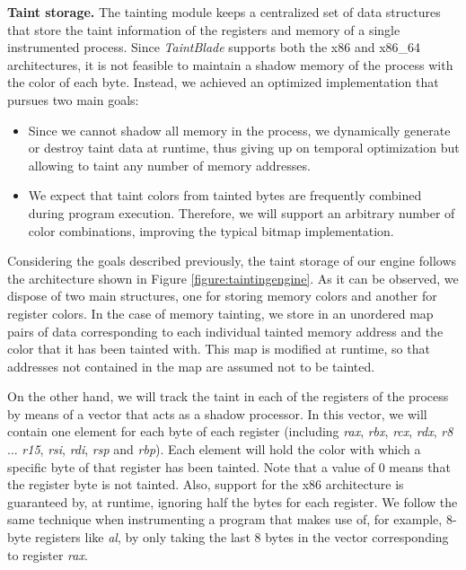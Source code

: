 \documentclass[conference]{IEEEtran}
\begin{document}
\textbf{Taint storage.} The tainting module keeps a centralized set
of data structures that store the taint information of the registers and memory of
a single instrumented process.
Since \textit{TaintBlade} supports both the x86 and x86\_64 architectures, it is not feasible to
maintain a shadow memory of the process with the color of each byte. Instead, we
achieved an optimized implementation that pursues two main goals:
\begin{itemize}
    \item Since we cannot shadow all memory in the process, we dynamically generate or
          destroy taint data at runtime, thus giving up on temporal optimization but
          allowing to taint any number of memory addresses.
    \item We expect that taint colors from tainted bytes are frequently combined during
          program execution. Therefore, we will support an arbitrary number of color
          combinations, improving the typical bitmap implementation.
\end{itemize}

Considering the goals described previously, the taint storage of our engine
follows the architecture shown in Figure \ref{figure:taintingengine}. As it can
be observed, we dispose of two main structures, one for storing memory colors
and another for register colors. In the case of memory tainting, we store in an
unordered map pairs of data corresponding to each individual tainted memory
address and the color that it has been tainted with. This map is modified at
runtime, so that addresses not contained in the map are assumed not to be
tainted.

On the other hand, we will track the taint in each of the registers of the
process by means of a vector that acts as a shadow processor. In this vector,
we will contain one element for each byte of each register (including
\textit{rax}, \textit{rbx}, \textit{rcx}, \textit{rdx}, \textit{r8} ...
\textit{r15}, \textit{rsi}, \textit{rdi}, \textit{rsp} and \textit{rbp}). Each
element will hold the color with which a specific byte of that register has
been tainted. Note that a value of 0 means that the register byte is not
tainted. Also, support for the x86 architecture is guaranteed by, at runtime,
ignoring half the bytes for each register. We follow the same technique when
instrumenting a program that makes use of, for example, 8-byte registers like
\textit{al}, by only taking the last 8 bytes in the vector corresponding to
register \textit{rax}.
\end{document}
